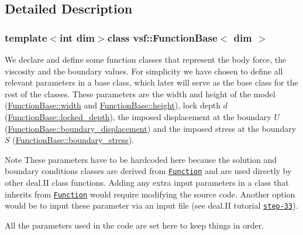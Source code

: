 \subsection{Detailed Description}
\subsubsection*{template$<$int dim$>$class vsf\-::\-Function\-Base$<$ dim $>$}

We declare and define some function classes that represent the body force, the viscosity and the boundary values. For simplicity we have chosen to define all relevant parameters in a base class, which later will serve as the base class for the rest of the classes. These parameters are the width and height of the model (\hyperlink{classvsf_1_1FunctionBase_ad2bf6791357d301b7d838b6188ef646e}{Function\-Base\-::width} and \hyperlink{classvsf_1_1FunctionBase_acfffb54eadb79217d150a73e3797b25a}{Function\-Base\-::height}), lock depth $d$ (\hyperlink{classvsf_1_1FunctionBase_ae06ffa81ca26e9ead535d50596d852c1}{Function\-Base\-::locked\-\_\-depth}), the imposed displacement at the boundary $U$ (\hyperlink{classvsf_1_1FunctionBase_a70a9a9f8a1a73386e582c529338f2d5e}{Function\-Base\-::boundary\-\_\-displacement}) and the imposed stress at the boundary $S$ (\hyperlink{classvsf_1_1FunctionBase_a342cfaf03d11de71ca34234f48e8825e}{Function\-Base\-::boundary\-\_\-stress}).

\begin{DoxyNote}{Note}
These parameters have to be hardcoded here because the solution and boundary conditions classes are derived from \href{https://www.dealii.org/8.2.0/doxygen/deal.II/classFunction.html}{\tt Function} and are used directly by other deal.\-I\-I class functions. Adding any extra input parameters in a class that inherits from \href{https://www.dealii.org/8.2.0/doxygen/deal.II/classFunction.html}{\tt Function} would require modifying the source code. Another option would be to input these parameter via an input file (see deal.\-I\-I tutorial \href{https://www.dealii.org/8.2.0/doxygen/deal.II/step_33.html}{\tt step-\/33}).
\end{DoxyNote}
All the parameters used in the code are set here to keep things in order. 


